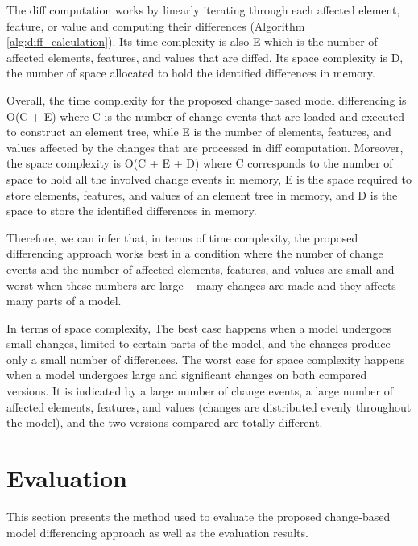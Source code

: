 The diff computation works by linearly iterating through each affected element, feature, or value and computing their differences (Algorithm \ref{alg:diff_calculation}). Its time complexity is also \textsf{E} which is the number of affected elements, features, and values that are diffed. Its space complexity is \textsf{D}, the number of space allocated to hold the identified differences in memory. 

Overall, the time complexity for the proposed change-based model differencing is \textsf{O}(\textsf{C} + \textsf{E}) where \textsf{C} is the number of change events that are loaded and executed to construct an element tree, while \textsf{E} is the number of elements, features, and values affected by the changes that are processed in diff computation. Moreover, the space complexity is \textsf{O}(\textsf{C} + \textsf{E} + \textsf{D}) where \textsf{C} corresponds to the number of space to hold all the involved change events in memory, \textsf{E} is the space required to store elements, features, and values of an element tree in memory, and \textsf{D} is the space to store the identified differences in memory.

Therefore, we can infer that, in terms of time complexity, the proposed differencing approach works best in a condition where the number of change events and the number of affected elements, features, and values are small and worst when these numbers are large -- many changes are made and they affects many parts of a model. 

In terms of space complexity, The best case happens when a model undergoes small changes, limited to certain parts of the model, and the changes produce only a small number of differences. The worst case for space complexity happens when a model undergoes large and significant changes on both compared versions. It is indicated by a large number of change events, a large number of affected elements, features, and values (changes are distributed evenly throughout the model), and the two versions compared are totally different.  


\section{Evaluation}
\label{sec:evaluation_6}
This section presents the method used to evaluate the proposed change-based model differencing approach as well as the evaluation results.

